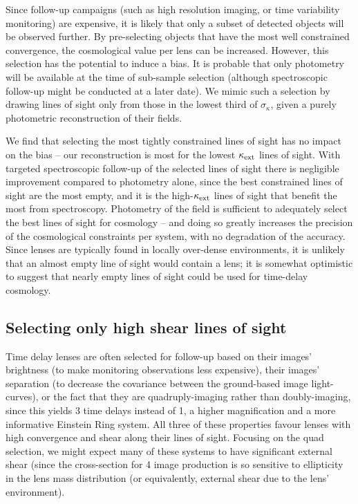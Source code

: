 \documentclass[useAMS,usenatbib,a4paper]{mn2e}
\begin{document}
Since follow-up campaigns (such as high resolution imaging, or time
variability monitoring) are expensive, it is likely that only a subset of
detected objects will be observed further. By pre-selecting objects that have 
the most well constrained convergence, the cosmological value per lens can be
increased. However, this selection has the potential to induce a bias. It is
probable that only photometry will be available at the time of sub-sample
selection (although spectroscopic follow-up might be conducted at a later
date). We mimic such a selection by drawing lines of sight only from those in
the lowest third of $\sigma_{\kappa}$, given a purely photometric
reconstruction of their fields. 

We find that selecting the most tightly constrained lines of sight has no impact on the
bias -- our reconstruction is most \succesful for the lowest
$\kappa_{\rm ext}$ lines of sight. With targeted spectroscopic follow-up of the selected lines of sight
there is negligible improvement compared to photometry alone, since the best constrained lines of sight are
the most empty, and it is the high-$\kappa_{\rm ext}$ lines of sight that benefit the
most from spectroscopy. Photometry of the field is sufficient to adequately
select the best lines of sight for cosmology -- and doing so greatly increases
 the precision of the cosmological constraints per system, with no degradation of the accuracy.
Since lenses are typically found in locally over-dense environments, it is unlikely that 
an almost empty line of sight would contain a lens; it is somewhat optimistic to 
suggest that nearly empty lines of sight could be used for time-delay cosmology. 


\subsection{Selecting only high shear lines of sight}
\label{sec:bias:tightPDF}

Time delay lenses are often selected for follow-up based on their images'
brightness (to make monitoring observations less expensive), their images'
separation (to decrease the covariance between the ground-based image
light-curves), or the fact that they are quadruply-imaging rather than
doubly-imaging, since this yields 3 time delays instead of 1, a higher
magnification and a more informative Einstein Ring system. All three of these
properties favour lenses with high convergence and shear along their lines of
sight. Focusing on the quad selection, we might expect many of these systems
to have significant external shear (since the cross-section for 4 image
production is so sensitive to ellipticity in the lens mass distribution (or
equivalently, external shear due to the lens' environment). 
\end{document}
